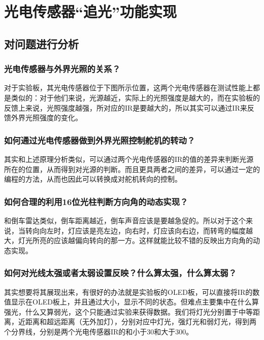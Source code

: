 \section{光电传感器“追光”功能实现}
\subsection{对问题进行分析}
\subsubsection{光电传感器与外界光照的关系？}
\par{对于实验板，其光电传感器位于下图所示位置，这两个光电传感器在测试性能上都是类似的：对于他们来说，光源越近，实际上的光照强度是越大的，而在实验板的反馈上来说，光照强度越强，所对应的IR是要越大的，所以其实可以通过IR来反馈外界光照强度的变化。

\subsubsection{如何通过光电传感器做到外界光照控制舵机的转动？}
\par{其实和上述原理分析类似，可以通过两个光电传感器的IR的值的差异来判断光源所在的位置，从而得到对光源的判断。而且更具两者之间的差异，可以通过一定的编程的方法，从而也因此可以转换成对舵机转向的控制。}

\subsubsection{如何合理的利用16位光柱判断方向角的动态实现？}
\par{和倒车雷达类似，倒车距离越近，倒车声音应该是要越急促的。所以对于这个来说，当转向向左时，灯应该是亮左边，向右时，灯应该向右边，而转弯的幅度越大，灯光所亮的应该越偏向转向的那一方。这样就能比较不错的反映出方向角的动态实现。}

\subsubsection{如何对光线太强或者太弱设置反映？什么算太强，什么算太弱？}
\par{其实想要将其展现出来，有很好的办法就是实验板的OLED板，可以直接将IR的数值显示在OLED板上，并且通过大小，显示不同的状态。但难点主要集中在什么算强光，什么又算弱光，这个只能通过实验来获得数据。我们将灯光分别置于中等距离，近距离和超远距离（无外加灯），分别对应中灯光，强灯光和弱灯光，得到两个分界线，分别是两个光电传感器IR的和小于30和大于300。}


}
